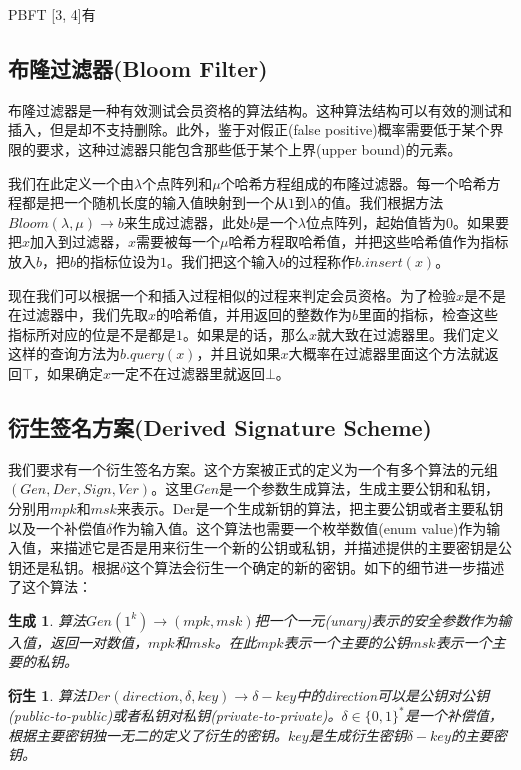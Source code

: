 \documentclass[UTF8]{ctexart}
\newtheorem*{generation}{生成}
\newtheorem*{derive}{衍生}
\begin{document}
PBFT [3, 4]有



\subsection{布隆过滤器(Bloom Filter)}
布隆过滤器是一种有效测试会员资格的算法结构。这种算法结构可以有效的测试和插入，但是却不支持删除。此外，鉴于对假正(false positive)概率需要低于某个界限的要求，这种过滤器只能包含那些低于某个上界(upper bound)的元素。

我们在此定义一个由$\lambda$个点阵列和$\mu$个哈希方程组成的布隆过滤器。每一个哈希方程都是把一个随机长度的输入值映射到一个从$1$到$\lambda$的值。我们根据方法$Bloom(\lambda, \mu) \to b$来生成过滤器，此处$b$是一个$\lambda$位点阵列，起始值皆为$0$。如果要把$x$加入到过滤器，$x$需要被每一个$\mu$哈希方程取哈希值，并把这些哈希值作为指标放入$b$，把$b$的指标位设为$1$。我们把这个输入$b$的过程称作$b.insert(x)$。

现在我们可以根据一个和插入过程相似的过程来判定会员资格。为了检验$x$是不是在过滤器中，我们先取$x$的哈希值，并用返回的整数作为$b$里面的指标，检查这些指标所对应的位是不是都是$1$。如果是的话，那么$x$就大致在过滤器里。我们定义这样的查询方法为$b.query(x)$，并且说如果$x$大概率在过滤器里面这个方法就返回$\top$，如果确定$x$一定不在过滤器里就返回$\bot$。

\subsection{衍生签名方案(Derived Signature Scheme)}
我们要求有一个衍生签名方案。这个方案被正式的定义为一个有多个算法的元组$(Gen, Der, Sign, Ver)$。这里$Gen$是一个参数生成算法，生成主要公钥和私钥，分别用$mpk$和$msk$来表示。Der是一个生成新钥的算法，把主要公钥或者主要私钥以及一个补偿值$\delta$作为输入值。这个算法也需要一个枚举数值(enum value)作为输入值，来描述它是否是用来衍生一个新的公钥或私钥，并描述提供的主要密钥是公钥还是私钥。根据$\delta$这个算法会衍生一个确定的新的密钥。如下的细节进一步描述了这个算法：

\begin{generation}
算法$Gen(1^k) \to (mpk, msk)$把一个一元(unary)表示的安全参数作为输入值，返回一对数值，$mpk$和$msk$。在此$mpk$表示一个主要的公钥$msk$表示一个主要的私钥。
\end{generation}

\begin{derive}
算法$Der(direction, \delta, key) \to \delta-key$中的direction可以是公钥对公钥(public-to-public)或者私钥对私钥(private-to-private)。$\delta \in \{0, 1\}^*$是一个补偿值，根据主要密钥独一无二的定义了衍生的密钥。$key$是生成衍生密钥$\delta-key$的主要密钥。
\end{derive}
\end{document}

